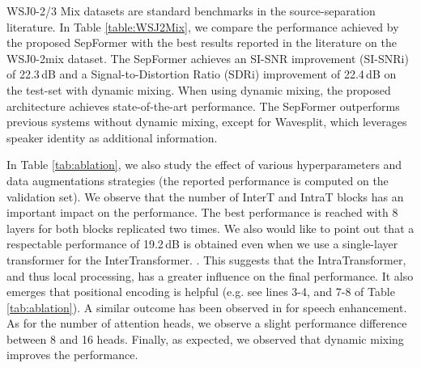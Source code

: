 \documentclass[lettersize,journal]{IEEEtran}
\begin{document}
WSJ0-2/3 Mix datasets are standard benchmarks in the source-separation literature. In Table \ref{table:WSJ2Mix}, we compare the performance achieved by the proposed SepFormer with the best results reported in the literature on the WSJ0-2mix dataset. The SepFormer achieves an SI-SNR improvement (SI-SNRi) of 22.3\,dB and a Signal-to-Distortion Ratio \cite{vincent2006performance} (SDRi) improvement of 22.4\,dB on the test-set with dynamic mixing. When using dynamic mixing, the proposed architecture achieves state-of-the-art performance. The SepFormer outperforms previous systems without dynamic mixing, except for Wavesplit, which leverages speaker identity as additional information. 

In Table \ref{tab:ablation}, we also study the effect of various hyperparameters and data augmentations strategies (the reported performance is computed on the validation set).
We observe that the number of InterT and IntraT blocks has an important impact on the performance. The best performance is reached with 8 layers for both blocks replicated two times. We also would like to point out that a respectable performance of 19.2\,dB is obtained even when we use a single-layer transformer for the InterTransformer. . This suggests that the IntraTransformer, and thus local processing, has a greater influence on the final performance. It also emerges that positional encoding is helpful (e.g. see lines 3-4, and 7-8 of Table \ref{tab:ablation}). A similar outcome has been observed in \cite{kim2020t} for speech enhancement. As for the number of attention heads, we observe a slight performance difference between 8 and 16 heads. Finally, as expected, we observed that dynamic mixing improves the performance.


\end{document}
